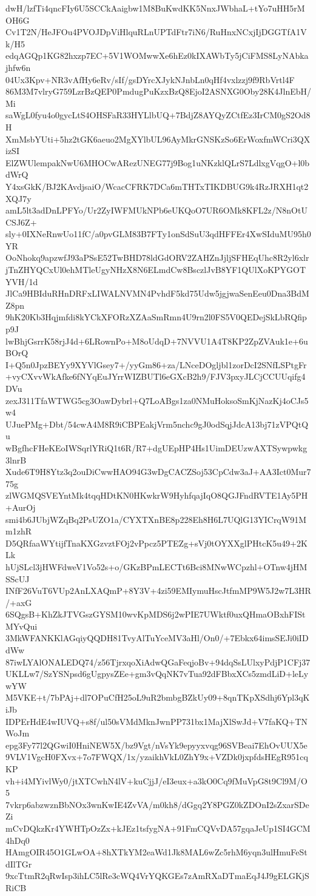 dwH/lzfTi4qncFIy6U5SCCkAaigbw1M8BuKwdKK5NnxJWbhaL+tYo7uHH5rMOH6G
Cv1T2N/HeJFOu4PVOJDpViHlquRLnUPTdFtr7iN6/RuHnxNCxjIjDGGTfA1Vk/H5
edqAGQp1KG82hxzp7EC+5V1WOMwwXe6hEz0kIXAWbTy5jCiFMS8LyNAbkajhfw6n
04Ux3Kpv+NR3vAfHy6eRv/sIf/gsDYrcXJykNJnbLn0qHf4vxlzzj9f9RbVrtl4F
86M3M7vlryG759LzrBzQEP0PmdugPuKzxBzQ8EjoI2ASNXG0Oby28K4JlnEbH/Mi
saWgL0fyu4o0gycLtS4OHSFaR33HYLlbUQ+7BdjZ8AYQyZCtfEz3IrCM0gS2Od8H
XmMsbYUti+5hz2tGK6aeuo2MgXYlbUL96AyMkrGNSKzSo6ErWoxfmWCri3QXizSI
ElZWUlempakNwU6MHOCwARezUNEG77j9Bog1uNKzklQLrS7LdlxgVqgO+l0bdWrQ
Y4xsGkK/BJ2KAvdjsaiO/WcacCFRK7DCa6mTHTxTIKDBUG9k4RzJRXH1qt2XQJ7y
amL5lt3adDnLPFYo/Ur2ZyIWFMUkNPb6eUKQoO7UR6OMk8KFL2z/N8nOtUCSJ6Z+
sly+0IXNeRnwUo11fC/a0pvGLM83B7FTy1onSdSuU3qdHFFEr4XwSIduMU95h0YR
OoNhokq9apzwfJ93aPSsE52TwBHD78ldGdORV2ZAHZnJjljSFHEqUhc8R2yl6xlr
jTnZHYQCxUl0ehMTleUgyNHzX8N6ELmdCw8BsczlJvB8YF1QUlXoKPYGOTYVH/1d
JlCa9HBIduRHnDRFxLIWALNVMN4PvhdF5kd75Udw5jgjwaSenEeu0Dna3BdMZ8pn
9hK20Kb3Hqjmfdi8kYCkXFORzXZAaSmRmn4U9rn2l0FS5V0QEDejSkLbRQfipp9J
lwBhjGsrrK58rjJ4d+6LRownPo+M8oUdqD+7NVVU1A4T8KP2ZpZVAuk1e+6uBOrQ
I+Q5n0JpzBEYy9XYVlGsey7+/yyGm86+za/LNceDOgljbl1zorDcI2SNfLSPtgFr
+vyCXvvWkAfke6fNYqEuJYrrWIZBUTl6eGXcB2h9/FJV3pxyJLCjCCUUqifg4DVu
zexJ311TfaWTWG5cg3OawDybrl+Q7LoABgs1za0NMuHoksoSmKjNazKj4oCJs5w4
UJuePMg+Dbt/54cwA4M8R9iCBPEakjVrm5nchc9gJ0odSqjJdcA13bj71zVPQtQu
wBgfhcFHeKEoIWSqrlYRiQ1t6R/R7+dgUEpHP4Hs1UimDEUzwAXTSywpwkg3lnrB
Xude6T9H8Ytz3q2ouDiCwwHAO94G3wDgCACZSoj53CpCdw3aJ+AA3Ict0Mur775g
zlWGMQSVEYntMk4tqqHDtKN0HKwkrW9HyhfqajIqO8QGJFndRVTE1Ay5PH+AurOj
smi4b6JUbjWZqBq2PsUZO1a/CYXTXnBE8p228Eh8H6L7UQlG13YICrqW91Mm1zhR
D5QRfaaWYtijfTnaKXGzvztFOj2vPpcz5PTEZg+sVj0tOYXXglPHtcK5u49+2KLk
hUjSLcl3jHWFdweV1Vo52s+o/GKzBPmLECTt6Bci8MNwWCpzhl+OTnw4jHMSScUJ
INfF26VuT6VUp2AnLXAQmP+8Y3V+4zi59EMIymuHscJtfmMP9W5J2w7L3HR/+axG
6SQgsB+KhZkJTVGszGYSM10wvKpMDS6j2wPIE7UWktf0uxQHmaOBxhFIStMYvQui
3MkWFANKKlAGqiyQQDH81TvyAlTuYceMV3aHl/On0/+7Ebkx64imsSEJi0iIDdWw
87iwLYAlONALEDQ74/z56TjrxqoXiAdwQGaFeqjoBv+94dqSsLUlxyPdjP1CFj37
UKLLw7/SzYSNpsd6gUgpysZEe+gm3vQqNK7vTua92dFBbxXCs5zmdLiD+leLywYW
M5VKE+t/7bPAj+dl7OPuCfH25oL9uR2bmbgBZkUy09+8qnTKpXSdhj6Ypl3qKiJb
IDPErHdE4wIUVQ+s8f/ul50sVMdMknJwnPP731bx1MajXlSwJd+V7faKQ+TNWoJm
epg3Fy77l2QGwiI0HniNEW5X/bz9Vgt/nVsYk9epyyxvqg96SVBeai7EhOvUUX5e
9VLV1VgcH0FXvx+7o7FWQX/1x/yzaikhVkL0ZhY9x+VZDk0jxpfdsHEgR951cqKP
vh+i4MYivlWy0/jtXTCwhN4lV+kuCjjJ/eI3eux+a3kO0Cq9fMuVpG8t9Cl9M/O5
7vkrp6abzwznBbNOx3wnKwIE4ZvVA/m0kh8/dGgq2Y8PGZ0kZDOnI2sZxarSDeZi
mCvDQkzKr4YWHTpOzZx+kJEz1tsfygNA+91FmCQVvDA57gqaJeUp1SI4GCM4hDq0
HAmgOIR45O1GLwOA+8hXTkYM2eaWd1Jk8MAL6wZc5rhM6yqn3ulHmuFeStdIlTGr
9xcTtmR2qRwIsp3ihLC5lRe3cWQ4VrYQKGEs7zAmRXaDTmaEqJ4J9gELGKjSRiCB
